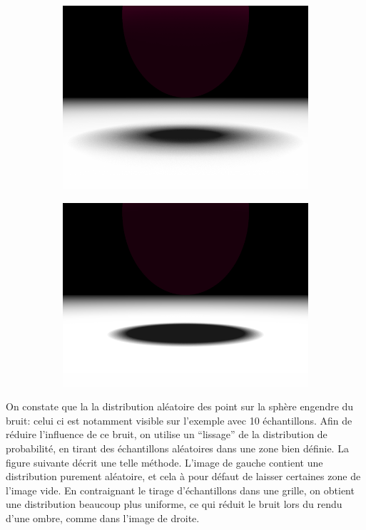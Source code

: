 \documentclass{article}
\begin{document}
\begin{figure}[hb]
  \begin{subfigure}{0.45\textwidth}
    \includegraphics[width=1\textwidth]{images/samples100r2.png}
  \end{subfigure}
  \begin{subfigure}{0.45\textwidth}
    \includegraphics[width=1\textwidth]{images/samples100r05.png}
  \end{subfigure}
\end{figure}

On constate que la la distribution aléatoire des point sur la sphère engendre
du bruit: celui ci est notamment visible sur l'exemple avec 10 échantillons.
Afin de réduire l'influence de ce bruit, on utilise un ``lissage'' de la
distribution de probabilité, en tirant des échantillons aléatoires dans une
zone bien définie. La figure suivante décrit une telle méthode. L'image de
gauche contient une distribution purement aléatoire, et cela à pour défaut de
laisser certaines zone de l'image vide. En contraignant le tirage
d'échantillons dans une grille, on obtient une distribution beaucoup plus
uniforme, ce qui réduit le bruit lors du rendu d'une ombre, comme dans l'image
de droite.
\end{document}
